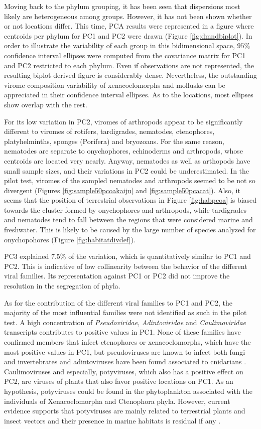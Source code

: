 \documentclass[
  openany]{book}
\begin{document}
Moving back to the phylum grouping, it has been seen that dispersions most likely are heterogeneous among groups. However, it has not been shown whether or not locations differ. This time, PCA results were represented in a figure where centroids per phylum for PC1 and PC2 were drawn (Figure \ref{fig:dmndbiplot}). In order to illustrate the variability of each group in this bidimensional space, \(95\%\) confidence interval ellipses were computed from the covariance matrix for PC1 and PC2 restricted to each phylum. Even if observations are not represented, the resulting biplot-derived figure is considerably dense. Nevertheless, the outstanding virome composition variability of xenacoelomorphs and mollusks can be appreciated in their confidence interval ellipses. As to the locations, most ellipses show overlap with the rest.

For its low variation in PC2, viromes of arthropods appear to be significantly different to viromes of rotifers, tardigrades, nematodes, ctenophores, platyhelminths, sponges (Porifera) and bryozoans. For the same reason, nematodes are separate to onychophores, echinoderms and arthropods, whose centroids are located very nearly. Anyway, nematodes as well as arthopods have small sample sizes, and their variations in PC2 could be underestimated. In the pilot test, viromes of the sampled nematodes and arthropods seemed to be not so divergent (Figures \ref{fig:sample50pcoakaiju} and \ref{fig:sample50pcacat}). Also, it seems that the position of terrestrial observations in Figure \ref{fig:habpcoa} is biased towards the cluster formed by onychophores and arthropods, while tardigrades and nematodes tend to fall between the regions that were considered marine and freshwater. This is likely to be caused by the large number of species analyzed for onychopohores (Figure \ref{fig:habitatdivdef}).

PC3 explained \(7.5\%\) of the variation, which is quantitatively similar to PC1 and PC2. This is indicative of low collinearity between the behavior of the different viral families. Its representation against PC1 or PC2 did not improve the resolution in the segregation of phyla.

As for the contribution of the different viral families to PC1 and PC2, the majority of the most influential families were not identified as such in the pilot test. A high concentration of \emph{Pseudoviridae}, \emph{Adintoviridae} and \emph{Caulimoviridae} transcripts contributes to positive values in PC1. None of these families have confirmed members that infect ctenophores or xenacoelomorphs, which have the most positive values in PC1, but pseudoviruses are known to infect both fungi and invertebrates and adintoviruses have been found associated to cnidarians \autocite{Starrett2021}. Caulimoviruses and especially, potyviruses, which also has a positive effect on PC2, are viruses of plants that also favor positive locations on PC1. As an hypothesis, potyviruses could be found in the phytoplankton associated with the individuals of Xenacoelomorpha and Ctenophora phyla. However, current evidence supports that potyviruses are mainly related to terrestrial plants and insect vectors and their presence in marine habitats is residual if any \autocite{Culley2003,Gibbs2008}.
\end{document}
